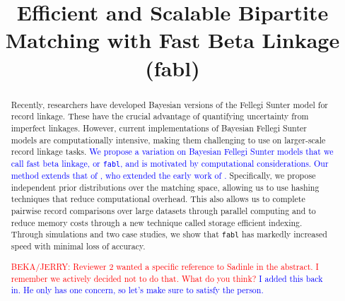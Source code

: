 \documentclass[ba]{imsart}
\begin{document}
\linenumbers
\begin{frontmatter}
\title{Efficient and Scalable Bipartite Matching with Fast Beta Linkage  (fabl)}


\begin{abstract}
Recently, researchers have developed Bayesian versions of the Fellegi Sunter model for record linkage. These have the crucial advantage of quantifying uncertainty from imperfect linkages.  However, current implementations of Bayesian Fellegi Sunter models are computationally intensive, making them challenging to use on larger-scale record linkage tasks.  \textcolor{blue}{We propose a variation on Bayesian Fellegi Sunter models that we call fast beta linkage, or \texttt{fabl}, and is motivated by computational considerations. 
Our method extends that of \cite{sadinle_bayesian_2017}, who extended the early work of \cite{fellegi_theory_1969}.}
Specifically, we propose independent prior distributions over the matching space, allowing us to use hashing techniques that reduce computational overhead. This also allows us to complete pairwise record comparisons over large datasets through parallel computing and to reduce memory costs through a new technique called storage efficient indexing. Through simulations and two case studies, we show that \texttt{fabl} has markedly increased speed with minimal loss of accuracy.

\textcolor{red}{BEKA/JERRY: Reviewer 2 wanted a specific reference to Sadinle in the abstract. I remember we actively decided not to do that. What do you think?} \textcolor{blue}{I added this back in. He only has one concern, so let's make sure to satisfy the person.}
\end{abstract}

\begin{keyword}%
\end{keyword}

\end{frontmatter}
\end{document}
